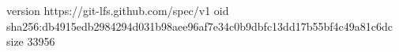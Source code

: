 version https://git-lfs.github.com/spec/v1
oid sha256:db4915edb2984294d031b98aee96af7e34c0b9dbfc13dd17b55bf4c49a81c6dc
size 33956
